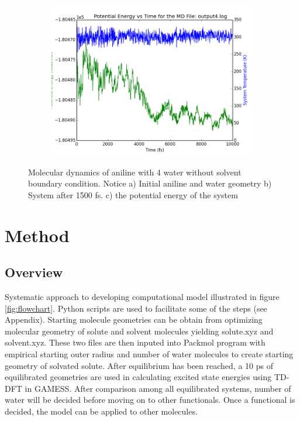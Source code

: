 \documentclass[
journal=jpcbfk, %
manuscript=article]{achemso}
\begin{document}
\begin{figure}[!tbp]
	\begin{subfigure}[b]{0.4\textwidth}
		\includegraphics[width=1\textwidth]{wB97XD/output4_log_EnergyPlot.png}
		\caption{}
		\label{fig:aniline4c)}
	\end{subfigure}
	\caption{Molecular dynamics of aniline with 4 water without solvent boundary condition. Notice  a) Initial aniline and water geometry b) System after 1500 fs. c) the potential energy of the system}
\end{figure}
\clearpage

\section{Method}
\subsection{Overview}
Systematic approach to developing computational model illustrated in figure \ref{fig:flowchart}. Python scripts are used to facilitate some of the steps (see Appendix). Starting molecule geometries can be obtain from optimizing molecular geometry of solute and solvent molecules yielding solute.xyz and solvent.xyz. These two files are then inputed into Packmol program with empirical starting outer radius and number of water molecules to create starting  geometry of solvated solute. After equilibrium has been reached, a 10 ps of equilibrated geometries are used in calculating excited state energies using TD-DFT in GAMESS. After comparison among all equilibrated systems, number of water will be decided before moving on to other functionals. Once a functional is decided, the model can be applied to other molecules. 
\end{document}
